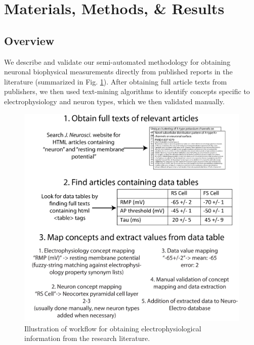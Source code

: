 \documentclass{template/frontiersSCNS} %
\begin{document}
\section{Materials, Methods, \& Results}

\subsection{Overview}

We describe and validate our semi-automated methodology for obtaining neuronal biophysical measurements directly from published reports in the literature (summarized in Fig. \ref{text_mining_workflow}).  
After obtaining full article texts from publishers, we then used text-mining algorithms to identify concepts specific to electrophysiology and neuron types, which we then validated manually.

\begin{figure}[htbp]
\centering
\includegraphics[scale = .8]{figures/SMeth2_text_mining_workflow_v2.jpg}
\caption{Illustration of workflow for obtaining electrophysiological information from the research literature.}
\label{text_mining_workflow}
\end{figure}
\end{document}
